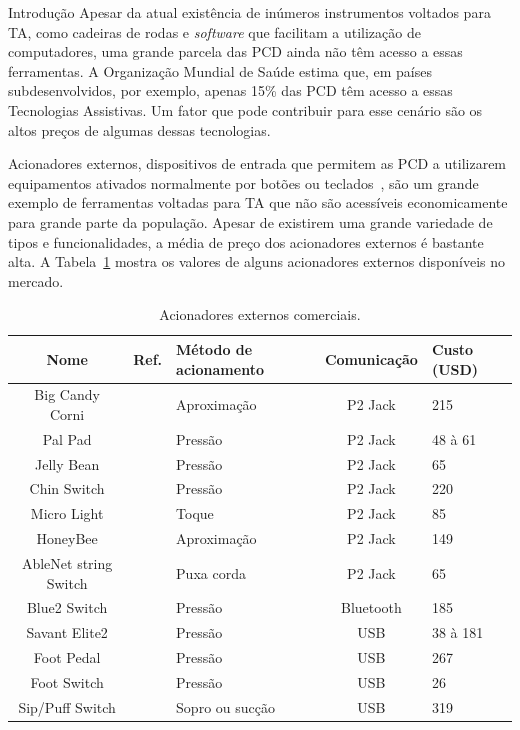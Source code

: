 \begin{chapter}{Introdução}
Apesar da atual existência de inúmeros instrumentos voltados para TA, como
cadeiras de rodas e \textit{software} que facilitam a utilização de
computadores, uma grande parcela das PCD ainda não têm acesso a essas
ferramentas. A Organização Mundial de Saúde estima que, em países
subdesenvolvidos, por exemplo, apenas 15\% das PCD têm acesso a essas Tecnologias
Assistivas\cite{WHO15}. Um fator que pode contribuir para esse cenário são os
altos preços de algumas dessas tecnologias. 

Acionadores externos, dispositivos de entrada que permitem as PCD a utilizarem
equipamentos ativados normalmente por botões ou teclados~\cite{tecla}, são um
grande exemplo de ferramentas voltadas para TA que não são acessíveis
economicamente para grande parte da população. Apesar de existirem uma grande 
variedade de tipos e funcionalidades, a média de preço dos acionadores externos
é bastante alta. A Tabela~\ref{tab:acionadores} mostra os valores de alguns acionadores
externos disponíveis no mercado. 
 
\begin{table}[!h]
\centering
\caption{Acionadores externos comerciais.}
\label{tab:acionadores}
\def\arraystretch{1.25}
\begin{tabular}{ccp{3cm}cp{3cm}}
	\hline
	\hline
	\textbf{Nome} & \textbf{Ref.} & \textbf{Método de acionamento} & \textbf{Comunicação} & \textbf{Custo (USD)} \\
	\hline
	Big Candy Corni        &~\cite{CandyCorn}        & Aproximação     & P2 Jack      & 215              \\
	Pal Pad                &~\cite{PalPad}           & Pressão         & P2 Jack      &  48 à 61         \\
	Jelly Bean             &~\cite{JellyBean}        & Pressão         & P2 Jack      &   65             \\
	Chin Switch            &~\cite{Chin}             & Pressão         & P2 Jack      & 220              \\
	Micro Light            &~\cite{MicroLight}       & Toque           & P2 Jack      & 85               \\ 
	HoneyBee               &~\cite{HoneyBee}         & Aproximação     & P2 Jack      & 149              \\
	AbleNet string Switch  &~\cite{StringSwitch}     & Puxa corda      & P2 Jack      & 65               \\
	Blue2 Switch           &~\cite{Blue2}            & Pressão         & Bluetooth    & 185              \\
	Savant Elite2          &~\cite{SavantElite2}     & Pressão         & USB          & 38 à 181         \\
	Foot Pedal             &~\cite{FootPedal}        & Pressão         & USB          & 267              \\
	Foot Switch            &~\cite{FootSwitch}       & Pressão         & USB          & 26               \\
	Sip/Puff Switch        &~\cite{SipPuff}          & Sopro ou sucção & USB          & 319              \\  
	

\end{tabular}
\end{table}
\end{chapter}

